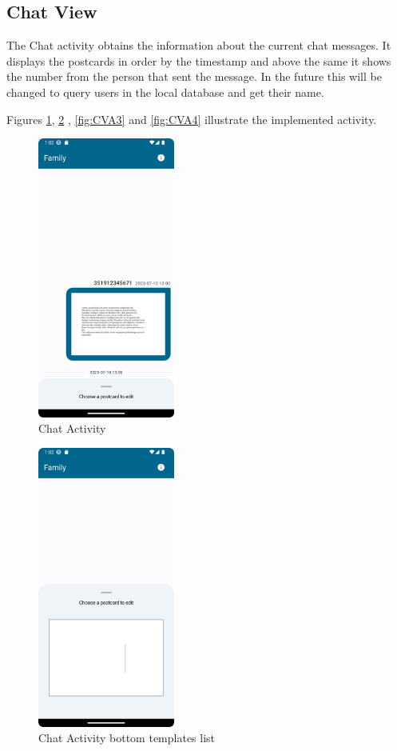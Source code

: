 \subsection{Chat View}
The Chat activity obtains the information about the current chat messages. 
It displays the postcards in order by the timestamp and above the same it shows the number from the person that sent the message. In the future this will be changed to query users in the local database and get their name.  

Figures \ref{fig:CVA1}, \ref{fig:CVA2} , \ref{fig:CVA3} and \ref{fig:CVA4} illustrate the implemented activity.

\begin{figure}[!ht]
	\centering
	\includegraphics[trim={0cm -3cm 0 -3cm}, width=0.4\textwidth]{./Chapter6/Figures/ChatActivity}
	\caption{Chat Activity}
	\label{fig:CVA1}
\end{figure}


\begin{figure}[!ht]
	\centering
	\includegraphics[trim={0cm -3cm 0 -3cm}, width=0.4\textwidth]{./Chapter6/Figures/ChatActivityShowPostcards}
	\caption{Chat Activity bottom templates list}
	\label{fig:CVA2}
\end{figure}


